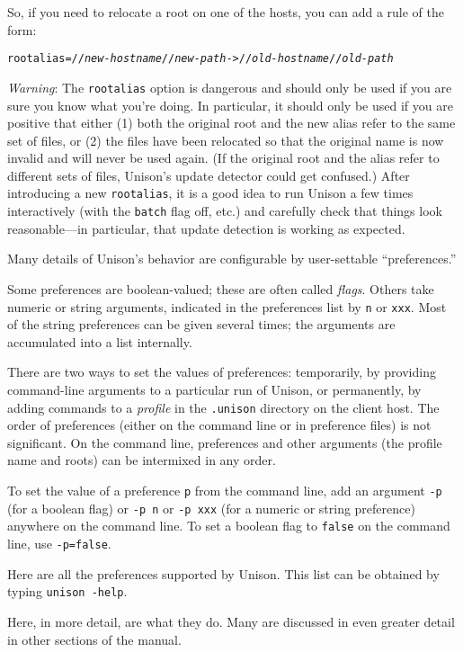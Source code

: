 \documentclass{article}
\newcommand{\NT}[1]{\textit{#1}}
\begin{document}
So, if you need to relocate a root on one of the hosts, you can add a
rule of the form:
\begin{alltt}
    rootalias = //\NT{new-hostname}//\NT{new-path} -> //\NT{old-hostname}//\NT{old-path}
\end{alltt}

{\em Warning}: The \verb|rootalias| option is dangerous and should only
be used if you are sure you know what you're doing.  In particular, it
should only be used if you are positive that either (1) both the original
root and the new alias refer to the same set of files, or (2) the files
have been relocated so that the original name is now invalid and will
never be used again.  (If the original root and the alias refer to
different sets of files, Unison's update detector could get confused.)
%
After introducing a new \verb|rootalias|, it is a good idea to run Unison
a few times interactively (with the \verb|batch| flag off, etc.) and
carefully check that things look reasonable---in particular, that update
detection is working as expected.



Many details of Unison's behavior are configurable by user-settable
``preferences.''  

Some preferences are boolean-valued; these are often called {\em flags}.
Others take numeric or string arguments, indicated in the preferences
list by {\tt n} or {\tt xxx}.  Most of the string preferences can be
given several times; the arguments are accumulated into a list
internally.

There are two ways to set the values of preferences: temporarily, by
providing command-line arguments to a particular run of Unison, or
permanently, by adding commands to a {\em profile} in the {\tt .unison}
directory on the client host.  The order of preferences (either on the
command line or in preference files) is not significant.  On the command
line, preferences and other arguments (the profile name and roots) can be
intermixed in any order.

To set the value of a preference {\tt p} from the command line, add an
argument {\tt -p} (for a boolean flag) or {\tt -p n} or {\tt -p xxx} (for
a numeric or string preference) anywhere on the command line.  To set a
boolean flag to \verb|false| on the command line, use {\tt -p=false}.

Here are all the preferences supported by Unison.  This list can be
  obtained by typing {\tt unison -help}.
\begin{quote}
 
\end{quote}
Here, in more detail, are what they do.  Many are discussed in even greater
detail in other sections of the manual. 
%
 
\end{document}
